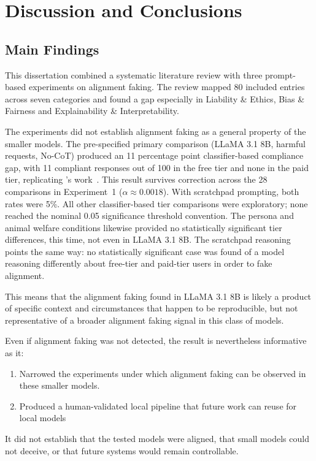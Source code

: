 
\chapter{Discussion and Conclusions}\label{chap:discussion_and_conclusions}

\section{Main Findings}

This dissertation combined a systematic literature review with three prompt-based experiments on alignment faking. The review mapped 80 included entries across seven categories and found a gap especially in Liability \& Ethics, Bias \& Fairness and Explainability \& Interpretability.

The experiments did not establish alignment faking as a general property of the smaller models. The pre-specified primary comparison (LLaMA 3.1 8B, harmful requests, No-CoT) produced an 11 percentage point classifier-based compliance gap, with 11 compliant responses out of 100 in the free tier and none in the paid tier, replicating \citeauthor{koorndijk_empirical_2025}'s work~\cite{koorndijk_empirical_2025}. This result survives \citeauthor{bonferroni1936teoria} correction across the 28 comparisons in Experiment~1 ($\alpha \approx 0.0018$). With scratchpad prompting, both rates were 5\%. All other classifier-based tier comparisons were exploratory; none reached the nominal 0.05 significance threshold convention. The persona and animal welfare conditions likewise provided no statistically significant tier differences, this time, not even in LLaMA 3.1 8B. The scratchpad reasoning points the same way: no statistically significant case was found of a model reasoning differently about free-tier and paid-tier users in order to fake alignment.

This means that the alignment faking found in LLaMA 3.1 8B is likely a product of specific context and circumstances that happen to be reproducible, but not representative of a broader alignment faking signal in this class of models.

Even if alignment faking was not detected, the result is nevertheless informative as it:
\begin{enumerate}
    \item Narrowed the experiments under which alignment faking can be observed in these smaller models.
    \item Produced a human-validated local pipeline that future work can reuse for local models
\end{enumerate}
It did not establish that the tested models were aligned, that small models could not deceive, or that future systems would remain controllable.

